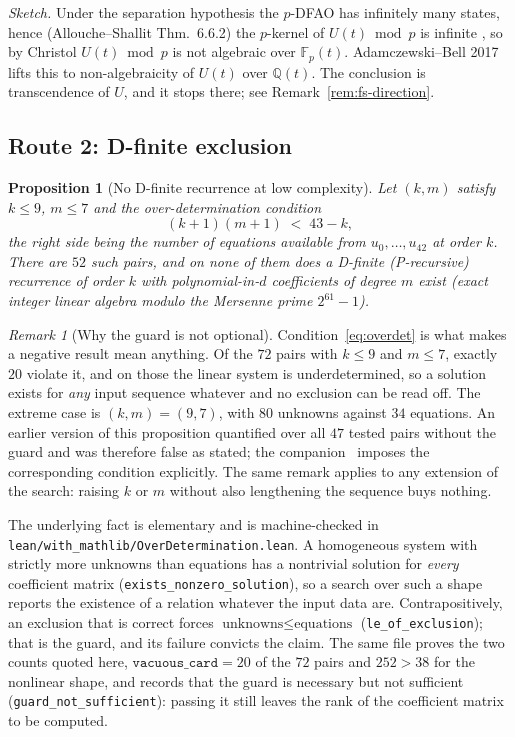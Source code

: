 \documentclass[11pt,a4paper]{article}
\newtheorem{proposition}{Proposition}
\theoremstyle{remark}
\newtheorem{remark}{Remark}
\theoremstyle{plain}
\begin{document}
\emph{Sketch.}  Under the separation hypothesis the $p$-DFAO has
infinitely many states, hence (Allouche--Shallit Thm.~6.6.2) the
$p$-kernel of $U(t) \bmod p$ is infinite \cite{AlloucheShallit}, so by
Christol \cite{Christol1979,CKMR} $U(t) \bmod p$ is not algebraic over
$\mathbb{F}_p(t)$.  Adamczewski--Bell 2017 lifts this to non-algebraicity of $U(t)$ over $\mathbb{Q}(t)$.
The conclusion is transcendence of $U$, and it stops there;
see Remark~\ref{rem:fs-direction}.

\subsection{Route 2: D-finite exclusion}
\label{ssec:dfinite-route}

\begin{proposition}[No D-finite recurrence at low complexity]
\label{prop:no-dfinite}
Let $(k,m)$ satisfy $k \le 9$, $m \le 7$ and the over-determination
condition
\begin{equation}\label{eq:overdet}
   (k+1)(m+1) \;<\; 43 - k ,
\end{equation}
the right side being the number of equations available from
$u_0, \ldots, u_{42}$ at order $k$. There are $52$ such pairs, and on
none of them does a D-finite (P-recursive) recurrence of order $k$ with
polynomial-in-$d$ coefficients of degree $m$ exist (exact integer linear
algebra modulo the Mersenne prime $2^{61}-1$).
\end{proposition}

\begin{remark}[Why the guard is not optional]
\label{rem:overdet}
Condition~\eqref{eq:overdet} is what makes a negative result mean
anything. Of the $72$ pairs with $k \le 9$ and $m \le 7$, exactly $20$
violate it, and on those the linear system is underdetermined, so a
solution exists for \emph{any} input sequence whatever and no exclusion
can be read off. The extreme case is $(k,m) = (9,7)$, with $80$ unknowns
against $34$ equations. An earlier version of this proposition quantified
over all $47$ tested pairs without the guard and was therefore false as
stated; the companion~\cite{Bonfioli2} imposes the corresponding
condition explicitly. The same remark applies to any extension of the
search: raising $k$ or $m$ without also lengthening the sequence buys
nothing.

The underlying fact is elementary and is machine-checked in
\texttt{lean/with\_mathlib/OverDetermination.lean}. A homogeneous system
with strictly more unknowns than equations has a nontrivial solution for
\emph{every} coefficient matrix (\texttt{exists\_nonzero\_solution}),
so a search over such a shape reports the existence of a relation
whatever the input data are. Contrapositively, an exclusion that is
correct forces $\text{unknowns} \le \text{equations}$
(\texttt{le\_of\_exclusion}); that is the guard, and its failure convicts
the claim. The same file proves the two counts quoted here,
$\texttt{vacuous\_card} = 20$ of the $72$ pairs and
$252 > 38$ for the nonlinear shape, and records that the guard is
necessary but not sufficient (\texttt{guard\_not\_sufficient}): passing
it still leaves the rank of the coefficient matrix to be computed.
\end{remark}
\end{document}
